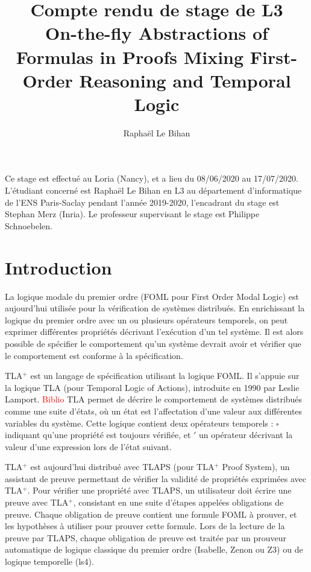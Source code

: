 \documentclass[12pt]{article}
\title{%
  Compte rendu de stage de L3\\
  \vspace{8pt}
  \large On-the-fly Abstractions of Formulas in Proofs
Mixing First-Order Reasoning and Temporal Logic}
\author{Raphaël Le Bihan}
\newcommand{\raph}[1]{\textcolor{red}{#1}}
\begin{document}
\fancyfoot[CEO]{\thepage}

\maketitle

Ce stage est effectué au Loria (Nancy), et a lieu du 08/06/2020 au 17/07/2020.
L'étudiant concerné est Raphaël Le Bihan en L3 au département d'informatique de l'ENS Paris-Saclay pendant l'année 2019-2020, l'encadrant du stage est Stephan Merz (Inria).
Le professeur supervisant le stage est Philippe Schnoebelen.


\clearpage

\section{Introduction}

La logique modale du premier ordre (FOML pour First Order Modal Logic) est aujourd'hui utilisée pour la vérification de systèmes distribués.
En enrichissant la logique du premier ordre avec un ou plusieurs opérateurs temporels, on peut exprimer différentes propriétés décrivant l'exécution d'un tel système.
Il est alors possible de spécifier le comportement qu'un système devrait avoir et vérifier que le comportement est conforme à la spécification.

TLA$^+$ est un langage de spécification utilisant la logique FOML.
Il s'appuie sur la logique TLA (pour Temporal Logic of Actions), introduite en 1990 par Leslie Lamport. \raph{Biblio}
TLA permet de décrire le comportement de systèmes distribués comme une suite d'états, où un état est l'affectation d'une valeur aux différentes variables du système.
Cette logique contient deux opérateurs temporels : $\square$ indiquant qu'une propriété est toujours vérifiée, et $'$ un opérateur décrivant la valeur d'une expression lors de l'état suivant.

TLA$^+$ est aujourd'hui distribué avec TLAPS (pour TLA$^+$ Proof System), un assistant de preuve permettant de vérifier la validité de propriétés exprimées avec TLA$^+$.
Pour vérifier une propriété avec TLAPS, un utilisateur doit écrire une preuve avec TLA$^+$, consistant en une suite d'étapes appelées obligations de preuve.
Chaque obligation de preuve contient une formule FOML à prouver, et les hypothèses à utiliser pour prouver cette formule.
Lors de la lecture de la preuve par TLAPS, chaque obligation de preuve est traitée par un prouveur automatique de logique classique du premier ordre (Isabelle, Zenon ou Z3) ou de logique temporelle (ls4).
\end{document}
